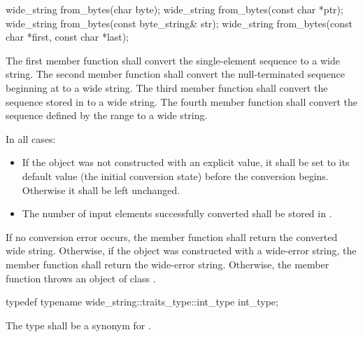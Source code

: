 %
%
\begin{itemdecl}
wide_string from_bytes(char byte);
wide_string from_bytes(const char *ptr);
wide_string from_bytes(const byte_string& str);
wide_string from_bytes(const char *first, const char *last);
\end{itemdecl}

\begin{itemdescr}
\pnum
\effects
The first member function shall convert the single-element sequence  to a
wide string. The second member function shall convert the null-terminated
sequence beginning at  to a wide string. The third member function
shall convert the sequence stored in  to a wide string. The fourth member
function shall convert the sequence defined by the range  to a
wide string.

\pnum
In all cases:

\begin{itemize}
\item If the  object was not constructed with an explicit value, it
shall be set to its default value (the initial conversion state) before the
conversion begins. Otherwise it shall be left unchanged.

\item The number of input elements successfully converted shall be stored in .
\end{itemize}

\pnum
\returns
If no conversion error occurs, the member function shall return the converted wide string.
Otherwise, if the object was constructed with a wide-error string, the
member function shall return the wide-error string.
Otherwise, the member function throws an object of class .
\end{itemdescr}

%
%
\begin{itemdecl}
typedef typename wide_string::traits_type::int_type int_type;
\end{itemdecl}

\begin{itemdescr}
The type shall be a synonym for .
\end{itemdescr}

